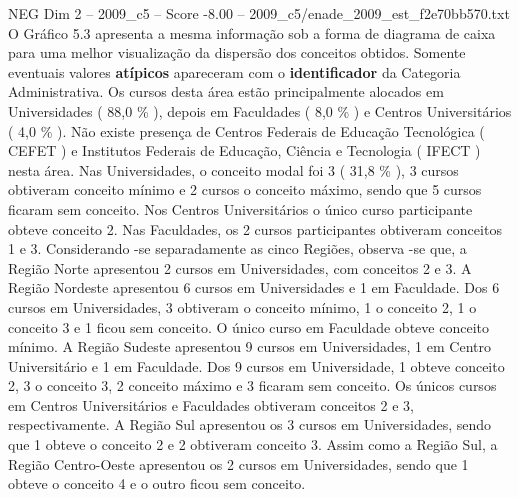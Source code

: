 \begin{textsample}{NEG Dim 2 – 2009\_c5 – Score -8.00 – 2009\_c5/enade\_2009\_est\_f2e70bb570.txt}
O Gráfico 5.3 apresenta a mesma informação sob a forma de diagrama de caixa para uma melhor visualização da dispersão dos conceitos obtidos.
Somente eventuais valores \textbf{atípicos} apareceram com o \textbf{identificador} da Categoria Administrativa.
Os cursos desta área estão principalmente alocados em Universidades ( 88,0 \% ), depois em Faculdades ( 8,0 \% ) e Centros Universitários ( 4,0 \% ).
Não existe presença de Centros Federais de Educação Tecnológica ( CEFET ) e Institutos Federais de Educação, Ciência e Tecnologia ( IFECT ) nesta área.
Nas Universidades, o conceito modal foi 3 ( 31,8 \% ), 3 cursos obtiveram conceito mínimo e 2 cursos o conceito máximo, sendo que 5 cursos ficaram sem conceito.
Nos Centros Universitários o único curso participante obteve conceito 2.
Nas Faculdades, os 2 cursos participantes obtiveram conceitos 1 e 3.
Considerando -se separadamente as cinco Regiões, observa -se que, a Região Norte apresentou 2 cursos em Universidades, com conceitos 2 e 3.
A Região Nordeste apresentou 6 cursos em Universidades e 1 em Faculdade.
Dos 6 cursos em Universidades, 3 obtiveram o conceito mínimo, 1 o conceito 2, 1 o conceito 3 e 1 ficou sem conceito.
O único curso em Faculdade obteve conceito mínimo.
A Região Sudeste apresentou 9 cursos em Universidades, 1 em Centro Universitário e 1 em Faculdade.
Dos 9 cursos em Universidade, 1 obteve conceito 2, 3 o conceito 3, 2 conceito máximo e 3 ficaram sem conceito.
Os únicos cursos em Centros Universitários e Faculdades obtiveram conceitos 2 e 3, respectivamente.
A Região Sul apresentou os 3 cursos em Universidades, sendo que 1 obteve o conceito 2 e 2 obtiveram conceito 3.
Assim como a Região Sul, a Região Centro-Oeste apresentou os 2 cursos em Universidades, sendo que 1 obteve o conceito 4 e o outro ficou sem conceito.

\end{textsample}
